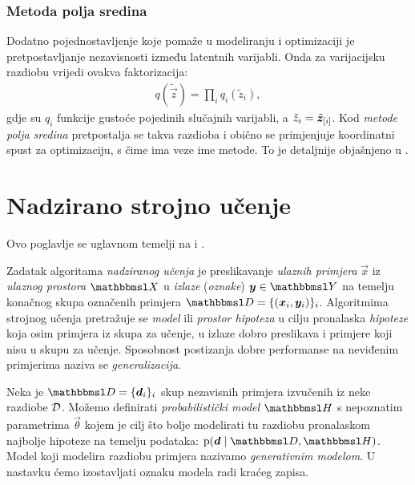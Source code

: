 \documentclass[utf8, diplomski, lmodern]{fer}
\begin{document}
\subsection{Metoda polja sredina}

Dodatno pojednostavljenje koje pomaže u modeliranju i optimizaciji je pretpostavljanje nezavisnosti između latentnih varijabli. Onda za varijacijsku razdiobu vrijedi ovakva faktorizacija:
\begin{align}
q(\tilde{\vec z}) = \prod_i q_i(\tilde{z}_i),
\end{align}
gdje su $q_i$ funkcije gustoće pojedinih slučajnih varijabli, a $\tilde{z}_i=\tilde{\vec z}_\ind{i}$. Kod \emph{metode polja sredina} pretpostalja se takva razdioba i obično se primjenjuje koordinatni spust za optimizaciju, s čime ima veze ime metode. To je detaljnije objašnjeno u \citet{Murphy:2012:MLPP}.

\iffalse
Neka je, radi kraćeg zapisa, $t(\tilde{\vec z}) \coloneqq \p(\rvec z=\tilde{\vec z},\rvec x=\vec x)$. Uz aproksimaciju polja sredina donja varijacijska granica postaje
\begin{align}
L_{\vec x}(\tilde{\rvec z}) 
&= \E_{\tilde{\rvec z}}\sbr{\ln t(\tilde{\vec z}) - \ln q(\tilde{\vec z})}
\\
&= \int\dif{\tilde{\vec z}} \del{\prod_i q_i(\tilde{z}_i)}\del{\ln t(\tilde{\vec z}) - \sum_j \ln q_j(\tilde{z}_j)}
\text{.}
\end{align}
\fi



\chapter{Nadzirano strojno učenje} \label{chap:nsu}

Ovo poglavlje se uglavnom temelji na \citet{Snajder:2014:SU} i \citet{Goodfellow:2016:DL}.

Zadatak algoritama \emph{nadziranog učenja} je preslikavanje \emph{ulaznih primjera} $\vec x$ iz \emph{ulaznog prostora} $\set{X}$ u \emph{izlaze} (\emph{oznake}) $\vec y\in\set{Y}$ na temelju konačnog skupa označenih primjera $\set{D} = \cbr{\del{\vec x_i,\vec y_i}}_{i}$. Algoritmima strojnog učenja pretražuje se \emph{model} ili \emph{prostor hipoteza} u cilju pronalaska \emph{hipoteze} koja osim primjera iz skupa za učenje, u izlaze dobro preslikava i primjere koji nisu u skupu za učenje. Sposobnost postizanja dobre performanse na neviđenim primjerima naziva se \emph{generalizacija}.

Neka je $\set{D}=\cbr{\vec d_i}_i$ skup nezavisnih primjera izvučenih iz neke razdiobe $\mathcal{D}$. Možemo definirati \emph{probabilistički model} $\set H$ s nepoznatim parametrima $\vec\theta$ kojem je cilj što bolje modelirati tu razdiobu pronalaskom najbolje hipoteze na temelju podataka: $\p(\vec{d}\mid\set{D},\set H)$. Model koji modelira razdiobu primjera nazivamo \emph{generativnim modelom}. U nastavku ćemo izostavljati oznaku modela radi kraćeg zapisa.
\end{document}
